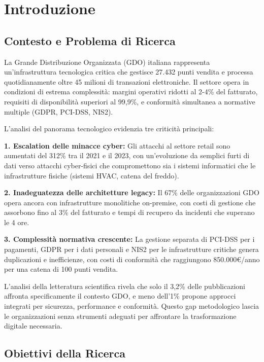 \documentclass[12pt,a4paper,twoside]{book}
\begin{document}
\chapter{Introduzione}
\label{cap:introduzione}

\section{Contesto e Problema di Ricerca}
\label{sec:contesto}

La Grande Distribuzione Organizzata (GDO) italiana rappresenta un'infrastruttura tecnologica critica che gestisce 27.432 punti vendita e processa quotidianamente oltre 45 milioni di transazioni elettroniche. Il settore opera in condizioni di estrema complessità: margini operativi ridotti al 2-4\% del fatturato, requisiti di disponibilità superiori al 99,9\%, e conformità simultanea a normative multiple (GDPR, PCI-DSS, NIS2).

L'analisi del panorama tecnologico evidenzia tre criticità principali:

\textbf{1. Escalation delle minacce cyber:} Gli attacchi al settore retail sono aumentati del 312\% tra il 2021 e il 2023, con un'evoluzione da semplici furti di dati verso attacchi cyber-fisici che compromettono sia i sistemi informatici che le infrastrutture fisiche (sistemi HVAC, catena del freddo).

\textbf{2. Inadeguatezza delle architetture legacy:} Il 67\% delle organizzazioni GDO opera ancora con infrastrutture monolitiche on-premise, con costi di gestione che assorbono fino al 3\% del fatturato e tempi di recupero da incidenti che superano le 4 ore.

\textbf{3. Complessità normativa crescente:} La gestione separata di PCI-DSS per i pagamenti, GDPR per i dati personali e NIS2 per le infrastrutture critiche genera duplicazioni e inefficienze, con costi di conformità che raggiungono 850.000€/anno per una catena di 100 punti vendita.

L'analisi della letteratura scientifica rivela che solo il 3,2\% delle pubblicazioni affronta specificamente il contesto GDO, e meno dell'1\% propone approcci integrati per sicurezza, performance e conformità. Questo gap metodologico lascia le organizzazioni senza strumenti adeguati per affrontare la trasformazione digitale necessaria.

\section{Obiettivi della Ricerca}
\label{sec:obiettivi}
\end{document}
